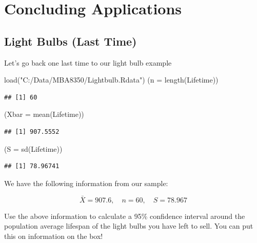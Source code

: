 \documentclass[
]{book}
\newenvironment{Shaded}{\begin{snugshade}}{\end{snugshade}}
\newcommand{\AttributeTok}[1]{\textcolor[rgb]{0.77,0.63,0.00}{#1}}
\newcommand{\FunctionTok}[1]{\textcolor[rgb]{0.00,0.00,0.00}{#1}}
\newcommand{\NormalTok}[1]{#1}
\newcommand{\StringTok}[1]{\textcolor[rgb]{0.31,0.60,0.02}{#1}}
\begin{document}
\hypertarget{concluding-applications}{%
\section{Concluding Applications}\label{concluding-applications}}

\hypertarget{light-bulbs-last-time}{%
\subsection{Light Bulbs (Last Time)}\label{light-bulbs-last-time}}

Let's go back one last time to our light bulb example

\begin{Shaded}
\begin{Highlighting}[]
\FunctionTok{load}\NormalTok{(}\StringTok{"C:/Data/MBA8350/Lightbulb.Rdata"}\NormalTok{)}
\NormalTok{(}\AttributeTok{n =} \FunctionTok{length}\NormalTok{(Lifetime))}
\end{Highlighting}
\end{Shaded}

\begin{verbatim}
## [1] 60
\end{verbatim}

\begin{Shaded}
\begin{Highlighting}[]
\NormalTok{(}\AttributeTok{Xbar =} \FunctionTok{mean}\NormalTok{(Lifetime))}
\end{Highlighting}
\end{Shaded}

\begin{verbatim}
## [1] 907.5552
\end{verbatim}

\begin{Shaded}
\begin{Highlighting}[]
\NormalTok{(}\AttributeTok{S =} \FunctionTok{sd}\NormalTok{(Lifetime))}
\end{Highlighting}
\end{Shaded}

\begin{verbatim}
## [1] 78.96741
\end{verbatim}

We have the following information from our sample:

\[\bar{X}=907.6, \quad n = 60, \quad S = 78.967\]

Use the above information to calculate a 95\% confidence interval around the population average lifespan of the light bulbs you have left to sell. You can put this on information on the box!
\end{document}
